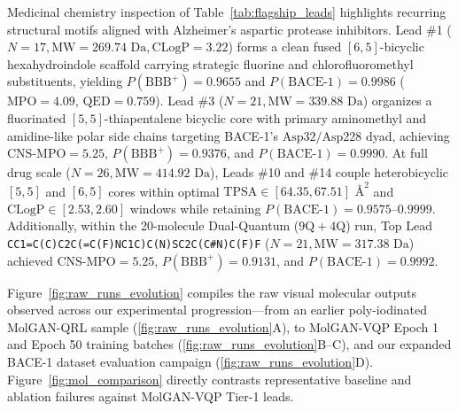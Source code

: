 \documentclass[10pt,a4paper]{article}
\begin{document}
Medicinal chemistry inspection of Table~\ref{tab:flagship_leads} highlights recurring structural motifs aligned with Alzheimer's aspartic protease inhibitors. Lead \#1 ($N=17, \mathrm{MW}=269.74\text{ Da}, \mathrm{CLogP}=3.22$) forms a clean fused $[6,5]$-bicyclic hexahydroindole scaffold carrying strategic fluorine and chlorofluoromethyl substituents, yielding $P(\text{BBB}^+) = 0.9655$ and $P(\text{BACE-1}) = 0.9986$ ($\mathrm{MPO} = 4.09$, $\mathrm{QED} = 0.759$). Lead \#3 ($N=21, \mathrm{MW}=339.88\text{ Da}$) organizes a fluorinated $[5,5]$-thiapentalene bicyclic core with primary aminomethyl and amidine-like polar side chains targeting BACE-1's $\text{Asp}32/\text{Asp}228$ dyad, achieving $\text{CNS-MPO} = 5.25$, $P(\text{BBB}^+) = 0.9376$, and $P(\text{BACE-1}) = 0.9990$. At full drug scale ($N=26, \mathrm{MW}=414.92\text{ Da}$), Leads \#10 and \#14 couple heterobicyclic $[5,5]$ and $[6,5]$ cores within optimal $\mathrm{TPSA} \in [64.35, 67.51]\text{ \AA}^2$ and $\mathrm{CLogP} \in [2.53, 2.60]$ windows while retaining $P(\text{BACE-1}) = 0.9575$--$0.9999$. Additionally, within the 20-molecule Dual-Quantum ($9\mathrm{Q}+4\mathrm{Q}$) run, Top Lead \texttt{CC1=C(C)C2C(=C(F)NC1C)\allowbreak C(N)SC2C(C\#N)C(F)F} ($N=21, \mathrm{MW}=317.38\text{ Da}$) achieved $\text{CNS-MPO}=5.25$, $P(\text{BBB}^+)=0.9131$, and $P(\text{BACE-1})=0.9992$.

Figure~\ref{fig:raw_runs_evolution} compiles the raw visual molecular outputs observed across our experimental progression---from an earlier poly-iodinated MolGAN-QRL sample (\ref{fig:raw_runs_evolution}A), to MolGAN-VQP Epoch 1 and Epoch 50 training batches (\ref{fig:raw_runs_evolution}B--C), and our expanded BACE-1 dataset evaluation campaign (\ref{fig:raw_runs_evolution}D). Figure~\ref{fig:mol_comparison} directly contrasts representative baseline and ablation failures against MolGAN-VQP Tier-1 leads.
\end{document}
